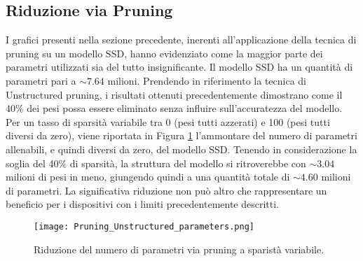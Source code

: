 \subsection{Riduzione via Pruning}
I grafici presenti nella sezione precedente, inerenti all'applicazione della tecnica di pruning su un modello SSD, hanno evidenziato come la maggior parte dei parametri utilizzati sia del tutto insignificante. Il modello SSD ha un quantità di parametri pari a $\sim{7.64}$ milioni. Prendendo in riferimento la tecnica di Unstructured pruning, i risultati ottenuti precedentemente dimostrano come il 40\% dei pesi possa essere eliminato senza influire sull'accuratezza del modello. Per un tasso di sparsità variabile tra 0 (pesi tutti azzerati) e 100 (pesi tutti diversi da zero), viene riportata in Figura \ref{par_pruning} l'ammontare del numero di parametri allenabili, e quindi diversi da zero, del modello SSD.
Tenendo in considerazione la soglia del 40\% di sparsità, la struttura del modello si ritroverebbe con $\sim{3.04}$ milioni di pesi in meno, giungendo quindi a una quantità totale di $\sim{4.60}$ milioni di parametri. La significativa riduzione non può altro che rappresentare un beneficio per i dispositivi con i limiti precedentemente descritti.
\begin{figure}
    \centering
    \texttt{[image: Pruning\_Unstructured\_parameters.png]}
    \centering
    \caption{Riduzione del numero di parametri via pruning a sparistà variabile.}
    \label{par_pruning}
\end{figure}
